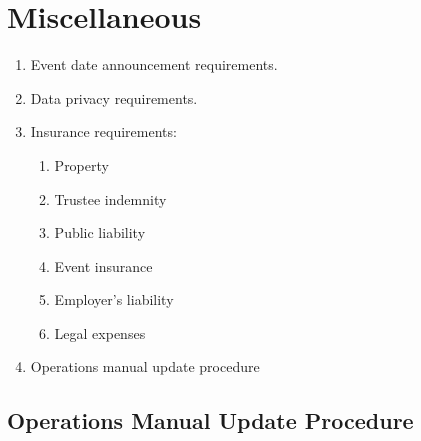\chapter{Miscellaneous}
\begin{enumerate}
\item Event date announcement requirements.
\item Data privacy requirements.
\item Insurance requirements:
  \begin{enumerate}
  \item Property
  \item Trustee indemnity
  \item Public liability
  \item Event insurance
  \item Employer's liability
  \item Legal expenses
  \end{enumerate}
\item Operations manual update procedure
\end{enumerate}

\section{Operations Manual Update Procedure}
\label{sec:ops-man-update-procedure}

